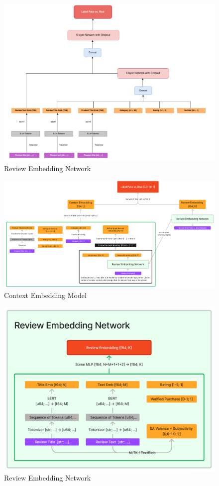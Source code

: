 \documentclass{article}
\begin{document}
\begin{figure}[htb]
  \centering
  \includegraphics[width=\linewidth]{./3bert.png}
  \caption{Review Embedding Network}
  \label{fig:3bert}
\end{figure}

\begin{figure}[htb]
  \centering
  \includegraphics[width=\linewidth]{./cem.png}
  \caption{Context Embedding Model}
  \label{fig:cem}
\end{figure}

\begin{figure}[htb]
  \centering
  \includegraphics[width=\linewidth]{./ren.png}
  \caption{Review Embedding Network}
  \label{fig:ren}
\end{figure}
\end{document}
